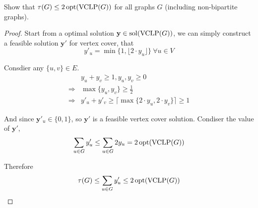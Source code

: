 \documentclass[11pt,a4paper,oneside]{article}
\newcommand{\y}{\mathbf{y}}
\newcommand{\sol}{\textup{\textrm{sol}}}
\newcommand{\opt}{\textup{\textrm{opt}}}
\begin{document}
\begin{problem}{3}
	\statement
     Show that $\tau(G) \leq 2\, \opt(\textrm{VCLP}(G))$ for all graphs $G$ (including non-bipartite graphs).
  
    \solution
    \begin{proof}
      Start from a optimal solution $\y \in \sol(\textrm{VCLP}(G))$, we can simply construct a feasible solution $\y'$ for vertex cover, that 
      $$ y'_u = \min\{1,\lfloor 2 \cdot y_u \rfloor\} ~ \forall u \in V$$
      
      Consdier any $\{u, v\} \in E$.
      \begin{align*}
        &y_u + y_v \geq 1, y_u, y_v \geq 0 \\
      \Rightarrow& \max \{y_u, y_v\} \geq \frac 12 \\
      \Rightarrow& y'_u + y'_v \geq \lceil \max \{2\cdot y_u, 2\cdot y_v\} \rceil \geq 1\end{align*}
      
      And since $\y'_u \in \{0, 1\}$, so $\y'$ is a feasible vertex cover solution. Condiser the value of $\y'$,
      $$ \sum_{u \in G}y'_u \leq \sum_{u \in G} 2y_u = 2\, \opt(\textrm{VCLP}(G))$$
      
      Therefore $$\tau(G) \leq \sum_{u \in G}y'_u \leq  2\, \opt(\textrm{VCLP}(G))$$
    
    \end{proof}
    
\end{problem}
\end{document}
